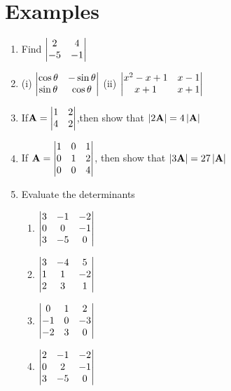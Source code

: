 \documentclass[journal,12pt,twocolumn]{IEEEtran}
\renewcommand\thesection{\arabic{section}}
\begin{document}
\section{Examples}
\renewcommand{\theequation}{\theenumi}
\begin{enumerate}[label=\thesection.\arabic*.,ref=\thesection.\theenumi]

\item Find 
$\begin{vmatrix}
2&4\\-5&-1
\end{vmatrix}$
\\
\solution 
%

\item (i) $\begin{vmatrix}\cos\theta& -\sin\theta\\ \sin\theta& \cos\theta \end{vmatrix}$ 
(ii) $\begin{vmatrix}
x^2-x+1& x-1\\ x+1&  x+1
\end{vmatrix}$
\\
\solution 
%
\item If$ \mathbf{A} = \begin{vmatrix}1&2\\4&2\end{vmatrix}$,then show that  
$\left\vert2\mathbf{A}\right\vert=4\left\vert\mathbf{A}\right\vert$
\\
\solution 
%
\item If $\mathbf{A}=\begin{vmatrix}1&0&1\\0&1&2\\0&0&4\end{vmatrix}$, then show that $\left\vert3\mathbf{A}\right\vert=27\left\vert\mathbf{A}\right\vert$
\\
\solution 
%
\item Evaluate the determinants
\begin{enumerate}
\item $\begin{vmatrix}
3&-1&-2\\0&0&-1\\3&-5&0
\end{vmatrix}$
\item $\begin{vmatrix}
3&-4&5\\1&1&-2\\2&3&1
\end{vmatrix}$
\\
\solution 
%
\item $\begin{vmatrix}
0&1&2 \\ -1&0&-3\\-2&3&0
\end{vmatrix}$
\item $\begin{vmatrix}
2&-1&-2\\0&2&-1\\3&-5&0
\end{vmatrix}$
\end{enumerate}  

\end{enumerate}
\end{document}
